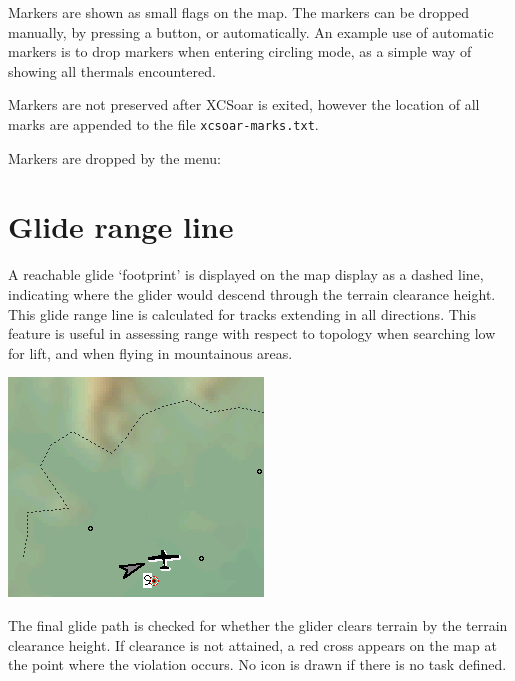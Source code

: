 \documentclass[a4paper,12pt]{refrep}
\begin{document}
Markers are shown as small flags on the map.  The markers can be dropped
manually, by pressing a button, or automatically.  An example use of
automatic markers is to drop markers when entering circling mode, as a
simple way of showing all thermals encountered.

Markers are not preserved after XCSoar is exited, however the location
of all marks are appended to the file \verb|xcsoar-marks.txt|.

Markers are dropped by the menu: 
\begin{quote}
\blink{}
\end{quote}

\section{Glide range line}

A reachable glide `footprint' is displayed on the map display as a
dashed line, indicating where the glider would descend through the
terrain clearance height.  This glide range line is calculated for
tracks extending in all directions.  This feature is useful in
assessing range with respect to topology when searching low for lift,
and when flying in mountainous areas.

\begin{center}
\includegraphics[angle=0,width=0.7\linewidth,keepaspectratio='true']{figures/cut-footprint.png}


\end{center}

The final glide path is checked for whether the glider clears terrain
by the terrain clearance height.  If clearance is not attained, a red
cross appears on the map at the point where the violation occurs.  No
icon is drawn if there is no task defined.
\end{document}
